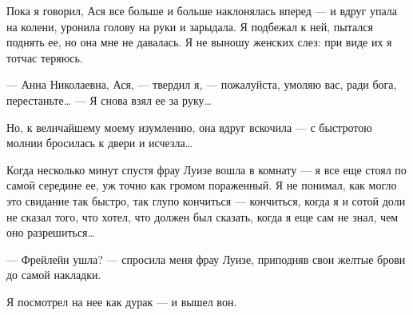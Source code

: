 Пока я говорил, Ася все больше и больше наклонялась вперед — и вдруг упала на колени, уронила голову на руки и зарыдала. Я подбежал к ней, пытался поднять ее, но она мне не давалась. Я не выношу женских слез: при виде их я тотчас теряюсь.

— Анна Николаевна, Ася, — твердил я, — пожалуйста, умоляю вас, ради бога, перестаньте… — Я снова взял ее за руку…

Но, к величайшему моему изумлению, она вдруг вскочила — с быстротою молнии бросилась к двери и исчезла…

Когда несколько минут спустя фрау Луизе вошла в комнату — я все еще стоял по самой середине ее, уж точно как громом пораженный. Я не понимал, как могло это свидание так быстро, так глупо кончиться — кончиться, когда я и сотой доли не сказал того, что хотел, что должен был сказать, когда я еще сам не знал, чем оно разрешиться…

— Фрейлейн ушла? — спросила меня фрау Луизе, приподняв свои желтые брови до самой накладки.

Я посмотрел на нее как дурак — и вышел вон.
